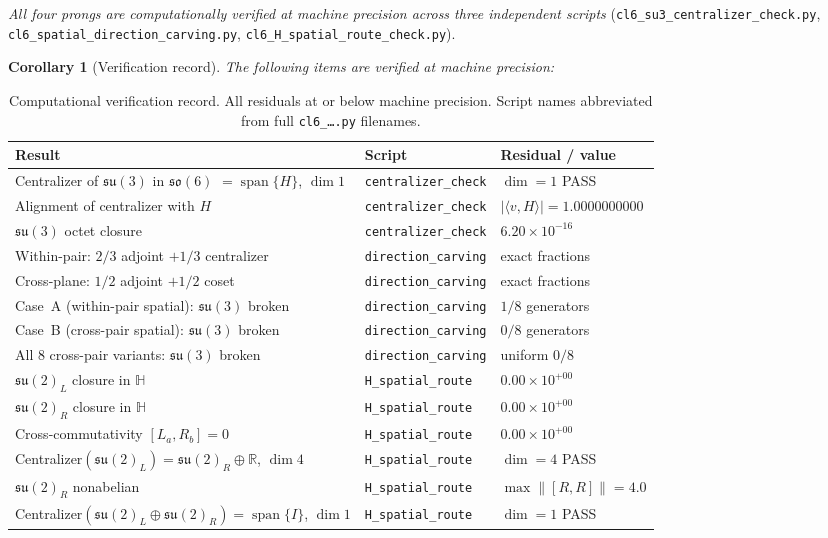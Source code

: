 \documentclass[aip,jmp,amsmath,amssymb,reprint,author-year]{revtex4-2}
\newtheorem{corollary}[theorem]{Corollary}
\begin{document}
\medskip
\emph{All four prongs are computationally verified at machine precision
across three independent scripts}
(\texttt{cl6\_su3\_centralizer\_check.py},
\texttt{cl6\_spatial\_direction\_carving.py},
\texttt{cl6\_H\_spatial\_route\_check.py}).

\begin{corollary}[Verification record]
\label{cor:verification}
The following items are verified at machine precision:
\end{corollary}

\begin{table}[ht]
\centering
\small
\begin{tabular}{p{5.5cm} l l}
\toprule
Result & Script & Residual / value \\
\midrule
Centralizer of $\mathfrak{su}(3)$ in $\mathfrak{so}(6)$
  $= \operatorname{span}\{H\}$, $\dim 1$
  & \texttt{centralizer\_check} & $\dim = 1$ PASS \\
Alignment of centralizer with $H$
  & \texttt{centralizer\_check}
  & $|\langle v,H\rangle| = 1.0000000000$ \\
$\mathfrak{su}(3)$ octet closure
  & \texttt{centralizer\_check} & $6.20 \times 10^{-16}$ \\
Within-pair: $2/3$ adjoint $+ 1/3$ centralizer
  & \texttt{direction\_carving} & exact fractions \\
Cross-plane: $1/2$ adjoint $+ 1/2$ coset
  & \texttt{direction\_carving} & exact fractions \\
Case~A (within-pair spatial): $\mathfrak{su}(3)$ broken
  & \texttt{direction\_carving} & $1/8$ generators \\
Case~B (cross-pair spatial): $\mathfrak{su}(3)$ broken
  & \texttt{direction\_carving} & $0/8$ generators \\
All 8 cross-pair variants: $\mathfrak{su}(3)$ broken
  & \texttt{direction\_carving} & uniform $0/8$ \\
$\mathfrak{su}(2)_L$ closure in $\mathbb{H}$
  & \texttt{H\_spatial\_route} & $0.00 \times 10^{+00}$ \\
$\mathfrak{su}(2)_R$ closure in $\mathbb{H}$
  & \texttt{H\_spatial\_route} & $0.00 \times 10^{+00}$ \\
Cross-commutativity $[L_a, R_b] = 0$
  & \texttt{H\_spatial\_route} & $0.00 \times 10^{+00}$ \\
Centralizer$(\mathfrak{su}(2)_L) = \mathfrak{su}(2)_R \oplus
  \mathbb{R}$, $\dim 4$
  & \texttt{H\_spatial\_route} & $\dim = 4$ PASS \\
$\mathfrak{su}(2)_R$ nonabelian
  & \texttt{H\_spatial\_route}
  & $\max\|[R,R]\| = 4.0$ \\
Centralizer$(\mathfrak{su}(2)_L \oplus \mathfrak{su}(2)_R) =
  \operatorname{span}\{I\}$, $\dim 1$
  & \texttt{H\_spatial\_route} & $\dim = 1$ PASS \\
\bottomrule
\end{tabular}
\caption{Computational verification record.  All residuals at or below
  machine precision.  Script names abbreviated from full
  \texttt{cl6\_\ldots.py} filenames.}
\label{tab:verification}
\end{table}
\end{document}
